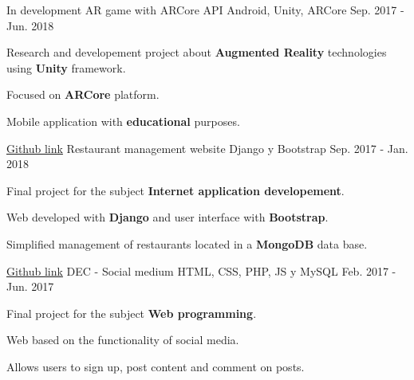 

\begin{cventries}

  \cventry
    {{In development}} %
    {AR game with ARCore API} %
    {Android, Unity, ARCore} %
    {Sep. 2017 - Jun. 2018} %
    {
      \begin{cvitems} %
        \item {Research and developement project about \textbf{Augmented Reality} technologies using \textbf{Unity} framework.}
        \item {Focused on \textbf{ARCore} platform.}
        \item {Mobile application with \textbf{educational} purposes.}
      \end{cvitems}
    }

  \cventry
    {\href{https://github.com/matl1995/DAI}{Github link}} %
    {Restaurant management website} %
    {Django y Bootstrap} %
    {Sep. 2017 - Jan. 2018} %
    {
      \begin{cvitems} %
        \item {Final project for the subject \textbf{Internet application developement}.}
        \item {Web developed with \textbf{Django} and user interface with \textbf{Bootstrap}.}
        \item {Simplified management of restaurants located in a \textbf{MongoDB} data base.}
      \end{cvitems}
    }

  \cventry
    {\href{https://github.com/matl1995/PW}{Github link}} %
    {DEC - Social medium} %
    {HTML, CSS, PHP, JS y MySQL} %
    {Feb. 2017 - Jun. 2017} %
    {
      \begin{cvitems} %
        \item {Final project for the subject \textbf{Web programming}.}
        \item {Web based on the functionality of social media.}
        \item {Allows users to sign up, post content and comment on posts.}
      \end{cvitems}
    }


\end{cventries}
